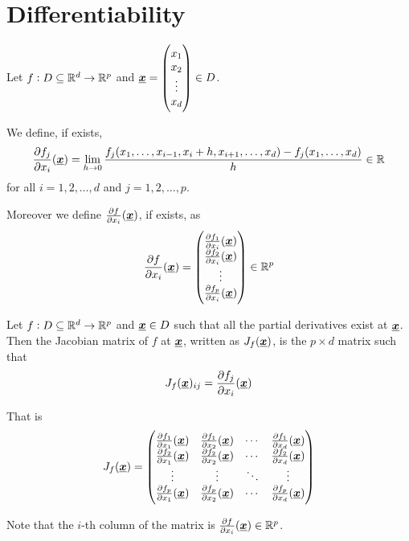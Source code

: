 \documentclass[12pt]{extarticle}
\renewcommand{\vec}[1]{\uvec{#1}}
\begin{document}
\section{Differentiability}

\begin{definition}
    Let $f: D \subseteq \mathbb{R}^d \to \mathbb{R}^p$ and $\vec{x} = \begin{pmatrix} x_1 \\ x_2 \\ \vdots \\ x_d \end{pmatrix} \in D$.

    We define, if exists,
    \begin{equation}
        \pdv{f_j}{x_i}()(\vec{x}) = \lim_{h \to 0} \frac{f_j(x_1, \ldots, x_{i-1}, x_i + h, x_{i+1}, \ldots, x_d) - f_j(x_1, \ldots, x_d)}{h} \in \R
    \end{equation}
    for all $i = 1, 2, \ldots, d$ and $j = 1, 2, \ldots, p$.

    Moreover we define $\pdv{f}{x_i}()(\vec{x})$, if exists, as
    \begin{equation}
        \pdv{f}{x_i}()(\vec{x}) = \begin{pmatrix}
            \pdv{f_1}{x_i}()(\vec{x}) \\
            \pdv{f_2}{x_i}()(\vec{x}) \\
            \vdots                    \\
            \pdv{f_p}{x_i}()(\vec{x})
        \end{pmatrix} \in \R^p
    \end{equation}
\end{definition}

\begin{definition}
    Let $f: D \subseteq \mathbb{R}^d \to \mathbb{R}^p$ and $\vec{x} \in D$ such that all the partial derivatives exist at $\vec{x}$.
    Then the Jacobian matrix of $f$ at $\vec{x}$, written as $J_f(\vec{x})$, is the $p \times d$ matrix such that
    \begin{equation}
        J_f(\vec{x})_{ij} = \pdv{f_j}{x_i}()(\vec{x})
    \end{equation}

    That is
    \begin{equation}
        J_f(\vec{x}) = \begin{pmatrix}
            \pdv{f_1}{x_1}()(\vec{x}) & \pdv{f_1}{x_2}()(\vec{x}) & \cdots & \pdv{f_1}{x_d}()(\vec{x}) \\
            \pdv{f_2}{x_1}()(\vec{x}) & \pdv{f_2}{x_2}()(\vec{x}) & \cdots & \pdv{f_2}{x_d}()(\vec{x}) \\
            \vdots                    & \vdots                    & \ddots & \vdots                    \\
            \pdv{f_p}{x_1}()(\vec{x}) & \pdv{f_p}{x_2}()(\vec{x}) & \cdots & \pdv{f_p}{x_d}()(\vec{x})
        \end{pmatrix}
    \end{equation}

    Note that the $i$-th column of the matrix is $\pdv{f}{x_i}()(\vec{x}) \in \R^p$.
\end{definition}
\end{document}
